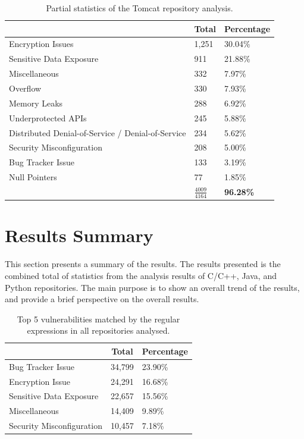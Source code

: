 \documentclass[12pt, a4paper]{report}
\begin{document}
\begin{table}[H]
  \centering
  \begin{tabular}{|l|l|l|}
    \hline \rowcolor[HTML]{D8D8D8}
    \multicolumn{1}{|c|}{Vulnerabilities} & \multicolumn{1}{|c|}{Total} &
    \multicolumn{1}{|c|}{Percentage} \\ \hline
    Encryption Issues & 1,251 & 30.04\% \\
    Sensitive Data Exposure & 911 & 21.88\% \\
    Miscellaneous & 332 & 7.97\% \\
    Overflow & 330 & 7.93\% \\
    Memory Leaks & 288 & 6.92\% \\
    Underprotected APIs & 245 & 5.88\% \\
    Distributed Denial-of-Service / Denial-of-Service & 234 & 5.62\% \\
    Security Misconfiguration & 208 & 5.00\% \\
    Bug Tracker Issue & 133 & 3.19\% \\
    Null Pointers & 77 & 1.85\% \\ \hline
    & \textbf{$\frac{4009}{4164}$} & \textbf{96.28\%} \\ \hline
  \end{tabular}
  \caption{Partial statistics of the Tomcat repository analysis.}
  \label{table:case_cpython}
\end{table}

\section{Results Summary}
This section presents a summary of the results. The results presented is the combined total
of statistics from the analysis results of C/C++, Java, and Python repositories. The main purpose is
to show an overall trend of the results, and provide a brief perspective on the overall results.

\begin{table}[H]
  \centering
  \begin{tabular}{|l|l|l|}
    \hline \rowcolor[HTML]{D8D8D8}
    \multicolumn{1}{|c|}{Vulnerabilities} & \multicolumn{1}{|c|}{Total} &
    \multicolumn{1}{|c|}{Percentage} \\ \hline
    Bug Tracker Issue & 34,799 & 23.90\% \\
    Encryption Issue & 24,291 & 16.68\% \\
    Sensitive Data Exposure & 22,657 & 15.56\% \\
    Miscellaneous & 14,409 & 9.89\% \\
    Security Misconfiguration & 10,457 & 7.18\% \\ \hline
  \end{tabular}
  \caption{Top 5 vulnerabilities matched by the regular expressions in all repositories analysed.}
  \label{table:top5_all}
\end{table}
\end{document}
